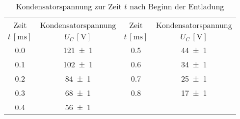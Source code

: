 \begin{table}[!h]
	\centering
	\begin{tabular}{|c|c||c|c|}
		\hline
		Zeit & Kondensatorspannung & Zeit & Kondensatorspannung \\
		$t\,[\si{\milli\second}]$ & ${U_{C}}\,[\si{\volt}]$ & 
		$t\,[\si{\milli\second}]$ & ${U_{C}}\,[\si{\volt}]$\\\hline\hline
		\num{0.0}  & \num{121(1)} & \num{0.5}  & \num{44(1)} \\
		\num{0.1}  & \num{102(1)} & \num{0.6}  & \num{34(1)} \\
		\num{0.2}  & \num{84(1)} &  \num{0.7}  & \num{25(1)} \\
		\num{0.3}  & \num{68(1)} &  \num{0.8}  & \num{17(1)} \\
		\num{0.4}  & \num{56(1)} &  &\\
		\hline
	\end{tabular}
	\caption{Kondensatorspannung zur Zeit $t$ nach Beginn der Entladung \label{tab:Auswertung_Entladen}}
\end{table}